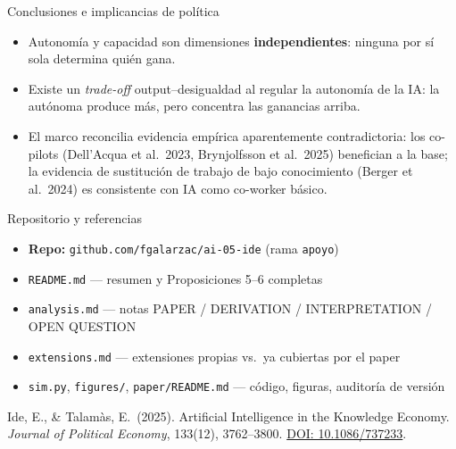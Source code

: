 \documentclass[aspectratio=169]{beamer}
\begin{document}
\begin{frame}{Conclusiones e implicancias de política}
\begin{itemize}
  \item Autonomía y capacidad son dimensiones \textbf{independientes}: ninguna por sí sola determina quién gana.
  \item Existe un \textit{trade-off} output--desigualdad al regular la autonomía de la IA: la autónoma produce más, pero concentra las ganancias arriba.
  \item El marco reconcilia evidencia empírica aparentemente contradictoria: los co-pilots (Dell'Acqua et al.\ 2023, Brynjolfsson et al.\ 2025) benefician a la base; la evidencia de sustitución de trabajo de bajo conocimiento (Berger et al.\ 2024) es consistente con IA como co-worker básico.
\end{itemize}
\end{frame}

\begin{frame}{Repositorio y referencias}
\begin{itemize}
  \item \textbf{Repo:} \texttt{github.com/fgalarzac/ai-05-ide} (rama \texttt{apoyo})
  \item \texttt{README.md} --- resumen y Proposiciones 5--6 completas
  \item \texttt{analysis.md} --- notas PAPER / DERIVATION / INTERPRETATION / OPEN QUESTION
  \item \texttt{extensions.md} --- extensiones propias vs.\ ya cubiertas por el paper
  \item \texttt{sim.py}, \texttt{figures/}, \texttt{paper/README.md} --- código, figuras, auditoría de versión
\end{itemize}
\vspace{0.4cm}
{\footnotesize Ide, E., \& Talamàs, E.\ (2025). Artificial Intelligence in the Knowledge Economy. \textit{Journal of Political Economy}, 133(12), 3762--3800. \href{https://doi.org/10.1086/737233}{DOI: 10.1086/737233}.}
\end{frame}
\end{document}
